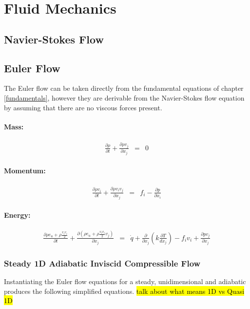 \chapter{Fluid Mechanics}
\newpage
\newpage
\section{Navier-Stokes Flow}

\newpage
\section{Euler Flow}
The Euler flow can be taken directly from the fundamental equations of chapter \ref{fundamentals}, however they are derivable from the Navier-Stokes flow equation by assuming that there are no viscous forces present. 
\subsubsection{Mass:}
\begin{eqnarray}        
    \frac{\partial \rho}{\partial t} +  \frac{\partial \rho v_j}{\partial x_j} &=& 0 
\end{eqnarray}        

\subsubsection{Momentum:}
\begin{eqnarray}        
    \frac{\partial \rho v_i}{\partial t} +  \frac{\partial \rho v_i v_j}{\partial x_j} &=& f_i - \frac{\partial p}{\partial x_i} 
\end{eqnarray}        

\subsubsection{Energy:}
\begin{eqnarray}        
\frac{\partial \rho e_u+ \rho\frac{v_i v_i}{2}}{\partial t} +  \frac{\partial (\rho e_u + \rho\frac{v_i v_i}{2} v_j)}{\partial x_j} &=&  \dot{q} + \frac{\partial} {\partial x_j} \left( k\frac{\partial T}{d x_j} \right) - f_i v_i  + \frac{\partial  p v_j }{\partial x_j} 
\end{eqnarray}        


\subsection{Steady 1D Adiabatic Inviscid Compressible Flow}
Instantiating the Euler flow equations for a steady, unidimensional and adiabatic produces the following simplified equations. 
\hl{talk about what means 1D vs Quasi 1D}
